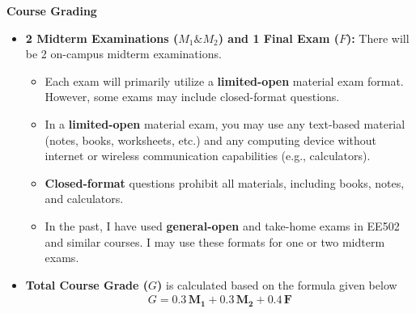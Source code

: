 \documentclass[11pt,oneside]{amsart}
\newcommand{\header}[1]{\bigbreak\textbf{#1}}
\begin{document}
\header{Course Grading}

\begin{itemize}

\item \textbf{2 Midterm Examinations ($M_1 \& M_2$) and 1 Final Exam ($F$):} There
  will be 2 on-campus midterm examinations. 

\vspace{3pt}


\begin{itemize}

    \item Each exam will primarily utilize a \textbf{limited-open} material exam format. However, some exams may include closed-format questions.

    \item In a \textbf{limited-open} material exam, you may use any text-based material (notes, books, worksheets, etc.) and any computing device without internet or wireless communication capabilities (e.g., calculators).

    \item \textbf{Closed-format} questions prohibit all materials, including books, notes, and calculators.

    \item In the past, I have used \textbf{general-open} and take-home exams in EE502 and similar courses. I may use these formats for one or two midterm exams.

\end{itemize}

\vspace{6pt}

\item \textbf{Total Course Grade ($G$)} is calculated based on the
  formula given below
%
\begin{align*}
  G = 0.3 \, \mathbf{M_1} + 0.3 \, \mathbf{M_2} + 0.4 \, \mathbf{F} 
\end{align*}

\end{itemize}
\end{document}
